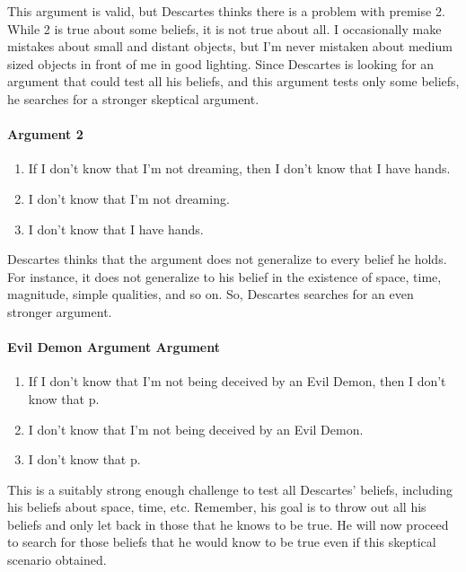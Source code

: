 \documentclass[]{article}
\begin{document}
This argument is valid, but Descartes thinks there is a problem with
premise 2. While 2 is true about some beliefs, it is not true about all.
I occasionally make mistakes about small and distant objects, but I'm
never mistaken about medium sized objects in front of me in good
lighting. Since Descartes is looking for an argument that could test all
his beliefs, and this argument tests only some beliefs, he searches for
a stronger skeptical argument.

\paragraph{Argument 2}\label{argument-2}

\begin{enumerate}
\def\labelenumi{\arabic{enumi}.}
\itemsep1pt\parskip0pt
\item
  If I don't know that I'm not dreaming, then I don't know that I have
  hands.
\item
  I don't know that I'm not dreaming.
\item
  I don't know that I have hands.
\end{enumerate}

Descartes thinks that the argument does not generalize to every belief
he holds. For instance, it does not generalize to his belief in the
existence of space, time, magnitude, simple qualities, and so on. So,
Descartes searches for an even stronger argument.

\paragraph{Evil Demon Argument
Argument}\label{evil-demon-argument-argument}

\begin{enumerate}
\def\labelenumi{\arabic{enumi}.}
\itemsep1pt\parskip0pt
\item
  If I don't know that I'm not being deceived by an Evil Demon, then I
  don't know that p.
\item
  I don't know that I'm not being deceived by an Evil Demon.
\item
  I don't know that p.
\end{enumerate}

This is a suitably strong enough challenge to test all Descartes'
beliefs, including his beliefs about space, time, etc. Remember, his
goal is to throw out all his beliefs and only let back in those that he
knows to be true. He will now proceed to search for those beliefs that
he would know to be true even if this skeptical scenario obtained.
\end{document}
